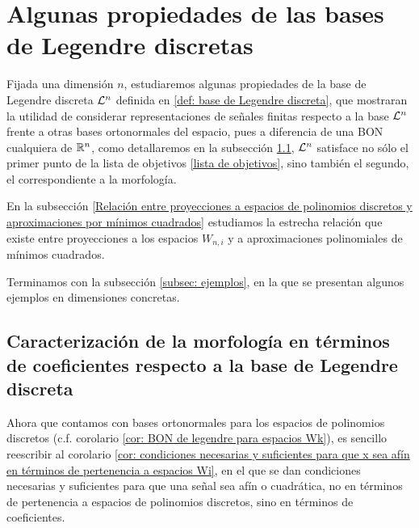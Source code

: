 \section{Algunas propiedades de las bases de Legendre discretas}

Fijada una dimensión $n$, estudiaremos algunas propiedades
de la base de Legendre discreta $\mathcal{L}^{n}$ definida en 
\ref{def: base de Legendre discreta}, que mostraran la utilidad
de considerar representaciones de señales finitas
respecto a la base
$\mathcal{L}^{n}$ frente a otras bases ortonormales del espacio, pues
a diferencia de una BON cualquiera de $\mathbb{R}^{n}$, como detallaremos
en la subsección 
\ref{Caracterización de la morfología en términos de coeficientes respecto a la base de Legendre discreta},
$\mathcal{L}^{n}$ satisface no sólo el primer punto
de la lista de objetivos
\ref{lista de objetivos}, sino también el segundo, el 
correspondiente a la morfología.

En la subsección 
\ref{Relación entre proyecciones a espacios de polinomios discretos y aproximaciones por mínimos cuadrados}
estudiamos la estrecha relación que existe entre
proyecciones a los espacios $W_{n,i}$ y a aproximaciones
polinomiales de mínimos cuadrados.

Terminamos con la subsección \ref{subsec: ejemplos},
en la que se presentan algunos ejemplos en 
dimensiones concretas.

\subsection{Caracterización de la morfología en términos de coeficientes respecto a la base de Legendre discreta}
\label{Caracterización de la morfología en términos de coeficientes respecto a la base de Legendre discreta}


Ahora que contamos con bases ortonormales
para los espacios de polinomios discretos
(c.f. corolario \ref{cor: BON de legendre para espacios Wk}),
es sencillo reescribir al corolario
\ref{cor: condiciones necesarias y suficientes para que x sea afín en términos de pertenencia a espacios Wi},
en el que se dan condiciones necesarias y suficientes para que
una señal sea afín o cuadrática,
no en términos de pertenencia a espacios de polinomios
discretos,
sino en términos de coeficientes.



